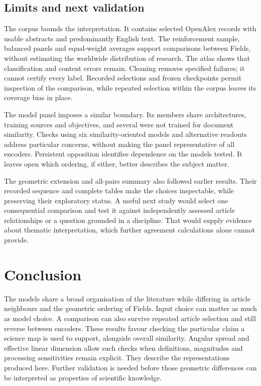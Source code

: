 \documentclass[12pt]{article}
\begin{document}
\subsection{Limits and next validation}
The corpus bounds the interpretation. It contains selected OpenAlex records with usable abstracts and predominantly English text. The reinforcement sample, balanced panels and equal-weight averages support comparisons between Fields, without estimating the worldwide distribution of research. The atlas shows that classification and content errors remain. Cleaning removes specified failures; it cannot certify every label. Recorded selections and frozen checkpoints permit inspection of the comparison, while repeated selection within the corpus leaves its coverage bias in place.

The model panel imposes a similar boundary. Its members share architectures, training sources and objectives, and several were not trained for document similarity. Checks using six similarity-oriented models and alternative readouts address particular concerns, without making the panel representative of all encoders. Persistent opposition identifies dependence on the models tested. It leaves open which ordering, if either, better describes the subject matter.

The geometric extension and all-pairs summary also followed earlier results. Their recorded sequence and complete tables make the choices inspectable, while preserving their exploratory status. A useful next study would select one consequential comparison and test it against independently assessed article relationships or a question grounded in a discipline. That would supply evidence about thematic interpretation, which further agreement calculations alone cannot provide.

\section{Conclusion}
The models share a broad organisation of the literature while differing in article neighbours and the geometric ordering of Fields. Input choice can matter as much as model choice. A comparison can also survive repeated article selection and still reverse between encoders. These results favour checking the particular claim a science map is used to support, alongside overall similarity. Angular spread and effective linear dimension allow such checks when definitions, magnitudes and processing sensitivities remain explicit. They describe the representations produced here. Further validation is needed before those geometric differences can be interpreted as properties of scientific knowledge.
\end{document}

